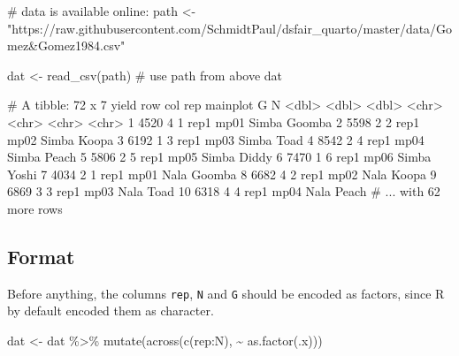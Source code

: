 \documentclass[
  letterpaper,
  DIV=11,
  numbers=noendperiod]{scrartcl}
\newenvironment{Shaded}{\begin{snugshade}}{\end{snugshade}}
\newcommand{\CommentTok}[1]{\textcolor[rgb]{0.37,0.37,0.37}{#1}}
\newcommand{\FunctionTok}[1]{\textcolor[rgb]{0.28,0.35,0.67}{#1}}
\newcommand{\NormalTok}[1]{\textcolor[rgb]{0.00,0.23,0.31}{#1}}
\newcommand{\OtherTok}[1]{\textcolor[rgb]{0.00,0.23,0.31}{#1}}
\newcommand{\SpecialCharTok}[1]{\textcolor[rgb]{0.37,0.37,0.37}{#1}}
\begin{document}
\begin{Shaded}
\begin{Highlighting}[]
\NormalTok{\# data is available online:}
\NormalTok{path \textless{}{-} "https://raw.githubusercontent.com/SchmidtPaul/dsfair\_quarto/master/data/Gomez\&Gomez1984.csv"}
\end{Highlighting}
\end{Shaded}

\begin{Shaded}
\begin{Highlighting}[]
\NormalTok{dat }\OtherTok{\textless{}{-}} \FunctionTok{read\_csv}\NormalTok{(path) }\CommentTok{\# use path from above}
\NormalTok{dat}
\end{Highlighting}
\end{Shaded}

\begin{Shaded}
\begin{Highlighting}[]
\NormalTok{\# A tibble: 72 x 7}
\NormalTok{   yield   row   col rep   mainplot G     N     }
\NormalTok{   \textless{}dbl\textgreater{} \textless{}dbl\textgreater{} \textless{}dbl\textgreater{} \textless{}chr\textgreater{} \textless{}chr\textgreater{}    \textless{}chr\textgreater{} \textless{}chr\textgreater{} }
\NormalTok{ 1  4520     4     1 rep1  mp01     Simba Goomba}
\NormalTok{ 2  5598     2     2 rep1  mp02     Simba Koopa }
\NormalTok{ 3  6192     1     3 rep1  mp03     Simba Toad  }
\NormalTok{ 4  8542     2     4 rep1  mp04     Simba Peach }
\NormalTok{ 5  5806     2     5 rep1  mp05     Simba Diddy }
\NormalTok{ 6  7470     1     6 rep1  mp06     Simba Yoshi }
\NormalTok{ 7  4034     2     1 rep1  mp01     Nala  Goomba}
\NormalTok{ 8  6682     4     2 rep1  mp02     Nala  Koopa }
\NormalTok{ 9  6869     3     3 rep1  mp03     Nala  Toad  }
\NormalTok{10  6318     4     4 rep1  mp04     Nala  Peach }
\NormalTok{\# ... with 62 more rows}
\end{Highlighting}
\end{Shaded}

\hypertarget{format}{%
\subsection{Format}\label{format}}

Before anything, the columns \texttt{rep}, \texttt{N} and \texttt{G}
should be encoded as factors, since R by default encoded them as
character.

\begin{Shaded}
\begin{Highlighting}[]
\NormalTok{dat }\OtherTok{\textless{}{-}}\NormalTok{ dat }\SpecialCharTok{\%\textgreater{}\%}
  \FunctionTok{mutate}\NormalTok{(}\FunctionTok{across}\NormalTok{(}\FunctionTok{c}\NormalTok{(rep}\SpecialCharTok{:}\NormalTok{N), }\SpecialCharTok{\textasciitilde{}} \FunctionTok{as.factor}\NormalTok{(.x)))}
\end{Highlighting}
\end{Shaded}
\end{document}

